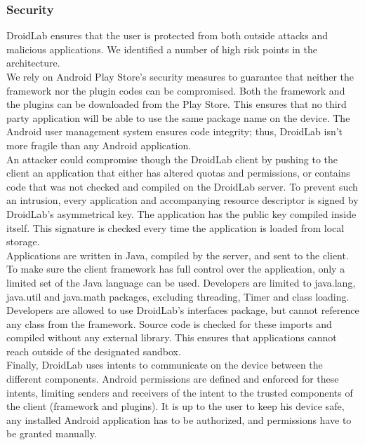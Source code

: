 \documentclass[conference,letterpaper]{IEEEtran}
\begin{document}
\subsubsection{Security}
DroidLab ensures that the user is protected from both outside attacks and malicious applications. We identified a number of high risk points in the architecture.\\
\indent We rely on Android Play Store's security measures to guarantee that neither the framework nor the plugin codes can be compromised. Both the framework and the plugins can be downloaded from the Play Store. This ensures that no third party application will be able to use the same package name on the device. The Android user management system ensures code integrity; thus, DroidLab isn't more fragile than any Android application.\\
\indent An attacker could compromise though the DroidLab client by pushing to the client an application that either has altered quotas and permissions, or contains code that was not checked and compiled on the DroidLab server. To prevent such an intrusion, every application and accompanying resource descriptor is signed by DroidLab's asymmetrical key. The application has the public key compiled inside itself. This signature is checked every time the application is loaded from local storage.\\
\indent Applications are written in Java, compiled by the server, and sent to the client. To make sure the client framework has full control over the application, only a limited set of the Java language can be used. Developers are limited to java.lang, java.util and java.math packages, excluding threading, Timer and class loading. Developers are allowed to use DroidLab's interfaces package, but cannot reference any class from the framework. Source code is checked for these imports and compiled without any external library. This ensures that applications cannot reach outside of the designated sandbox.\\
\indent Finally, DroidLab uses intents to communicate on the device between the different components. Android permissions are defined and enforced for these intents, limiting senders and receivers of the intent to the trusted components of the client (framework and plugins). It is up to the user to keep his device safe, any installed Android application has to be authorized, and permissions have to be granted manually.
\end{document}
